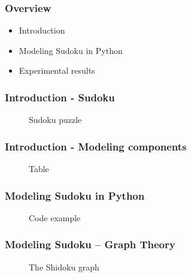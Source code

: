 \documentclass{beamer}
\title{\talktitle}
\author{\Us}
\date{\talkdate}
\begin{document}
\begin{frame}
  \titlepage
  \conferencebanner
\end{frame}

\begin{frame}
\frametitle{Overview}
 \begin{itemize}
  \item<1-> Introduction
  \item<2-> Modeling Sudoku in Python
  \item<3-> Experimental results      
 \end{itemize}
\end{frame}

\begin{frame}
\frametitle{Introduction - Sudoku}
 \begin{figure}[h]
  \centering
  \sudokuexampleone
  \caption{Sudoku puzzle}
 \end{figure} 
\end{frame}

\begin{frame}
\frametitle{Introduction - Modeling components}
 \begin{figure}[h]
  \centering
  \librarytable
  \caption{Table}
 \end{figure} 
\end{frame}

\begin{frame}[fragile]
\frametitle{Modeling Sudoku in Python}
 \begin{figure}[h]
  \centering
  
  \caption{Code example}
 \end{figure} 
\end{frame}

\begin{frame}[fragile]
\frametitle{Modeling Sudoku -- Graph Theory}
 \begin{figure}[h]
  \centering
  \begin{dot2tex}[circo,mathmode,options={--graphstyle "scale=0.25"}]
   
  \end{dot2tex}
  \caption{The Shidoku graph}
 \end{figure}
\end{frame}
\end{document}
